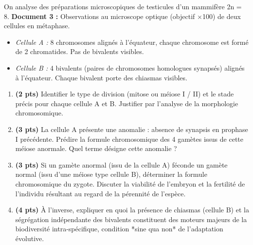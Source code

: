 \documentclass[11pt]{article}
\begin{document}
\begin{exercice}
On analyse des préparations microscopiques de testicules d'un mammifère 2n = 8.
\textbf{Document 3 :} Observations au microscope optique (objectif $\times$100) de deux cellules en métaphase.
\begin{itemize}
    \item \textit{Cellule A :} 8 chromosomes alignés à l'équateur, chaque chromosome est formé de 2 chromatides. Pas de bivalents visibles.
    \item \textit{Cellule B :} 4 bivalents (paires de chromosomes homologues synapsés) alignés à l'équateur. Chaque bivalent porte des chiasmas visibles.
\end{itemize}
\begin{enumerate}
    \item \textbf{(2 pts)} Identifier le type de division (mitose ou méiose I / II) et le stade précis pour chaque cellule A et B. Justifier par l'analyse de la morphologie chromosomique.
    \item \textbf{(3 pts)} La cellule A présente une anomalie : absence de synapsis en prophase I précédente. Prédire la formule chromosomique des 4 gamètes issus de cette méiose anormale. Quel terme désigne cette anomalie ?
    \item \textbf{(3 pts)} Si un gamète anormal (issu de la cellule A) féconde un gamète normal (issu d'une méiose type cellule B), déterminer la formule chromosomique du zygote. Discuter la viabilité de l'embryon et la fertilité de l'individu résultant au regard de la pérennité de l'espèce.
    \item \textbf{(4 pts)} À l'inverse, expliquer en quoi la présence de chiasmas (cellule B) et la ségrégation indépendante des bivalents constituent des moteurs majeurs de la biodiversité intra-spécifique, condition *sine qua non* de l'adaptation évolutive.
\end{enumerate}
\end{exercice}
\end{document}
